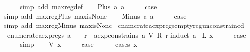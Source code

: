 \begin{isabellebody}
\ \ \ \ \isamarkupfalse%
\ {\isacharparenleft}simp\ add{\isacharcolon}\ max{\isacharunderscore}reg{\isacharunderscore}def{\isacharparenright}\isanewline
{}\isamarkupfalse%
\isanewline
\ \ \isamarkupfalse%
\ {\isacharparenleft}Plus\ a{}\ a{}{\isacharparenright}\isanewline
\ \ \isamarkupfalse%
\ \isamarkupfalse%
\ {\isacharquery}case\isanewline
\ \ \ \ \isamarkupfalse%
\ {\isacharparenleft}simp\ add{\isacharcolon}\ max{\isacharunderscore}reg{\isacharunderscore}Plus\ max{\isacharunderscore}is{\isacharunderscore}None{\isacharparenright}\isanewline
{}\isamarkupfalse%
\isanewline
\ \ \isamarkupfalse%
\ {\isacharparenleft}Minus\ a{}\ a{}{\isacharparenright}\isanewline
\ \ \isamarkupfalse%
\ \isamarkupfalse%
\ {\isacharquery}case\isanewline
\ \ \ \ \isamarkupfalse%
\ {\isacharparenleft}simp\ add{\isacharcolon}\ max{\isacharunderscore}reg{\isacharunderscore}Minus\ max{\isacharunderscore}is{\isacharunderscore}None{\isacharparenright}\isanewline
{}\isamarkupfalse%
%
\endisatagproof
{\isafoldproof}%
%
\isadelimproof
\isanewline
%
\endisadelimproof
\isanewline
\isanewline
{}\isamarkupfalse%
\ enumerate{\isacharunderscore}aexp{\isacharunderscore}regs{\isacharunderscore}empty{\isacharunderscore}reg{\isacharunderscore}unconstrained{\isacharcolon}\isanewline
\ \ {\isachardoublequoteopen}enumerate{\isacharunderscore}aexp{\isacharunderscore}regs\ a\ {\isacharequal}\ {\isacharbraceleft}{\isacharbraceright}\ {\isasymLongrightarrow}\ {\isasymforall}r{\isachardot}\ {\isasymnot}\ aexp{\isacharunderscore}constrains\ a\ {\isacharparenleft}V\ {\isacharparenleft}R\ r{\isacharparenright}{\isacharparenright}{\isachardoublequoteclose}\isanewline
%
\isadelimproof
%
\endisadelimproof
%
\isatagproof
{}\isamarkupfalse%
{\isacharparenleft}induct\ a{\isacharparenright}\isanewline
{}\isamarkupfalse%
\ {\isacharparenleft}L\ x{\isacharparenright}\isanewline
\ \ \isamarkupfalse%
\ \isamarkupfalse%
\ {\isacharquery}case\isanewline
\ \ \ \ \isamarkupfalse%
\ simp\isanewline
{}\isamarkupfalse%
\isanewline
\ \ \isamarkupfalse%
\ {\isacharparenleft}V\ x{\isacharparenright}\isanewline
\ \ \isamarkupfalse%
\ \isamarkupfalse%
\ {\isacharquery}case\isanewline
\ \ \ \ \isamarkupfalse%
\ {\isacharparenleft}cases\ x{\isacharparenright}\isanewline

\end{isabellebody}
